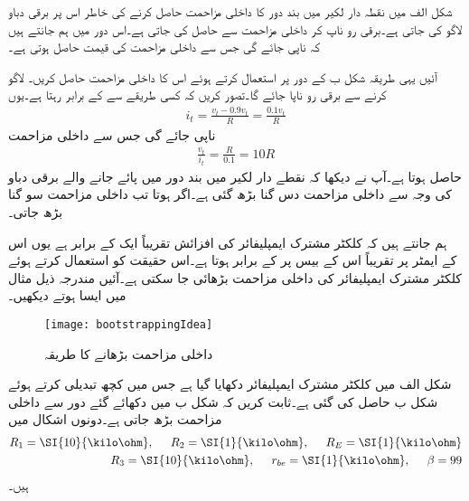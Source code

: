شکل  الف میں نقطہ دار لکیر میں بند دور کا داخلی مزاحمت حاصل کرنے کی خاطر اس پر  برقی دباو لاگو کی جاتی ہے۔برقی رو  ناپ کر داخلی مزاحمت  سے حاصل کی جاتی ہے۔اس دور میں ہم جانتے ہیں کہ  ناپی جائے گی جس سے داخلی مزاحمت کی قیمت  حاصل ہوتی ہے۔

آئیں یہی طریقہ شکل  ب کے دور پر استعمال کرتے ہوئے اس کا داخلی مزاحمت حاصل کریں۔ لاگو کرنے سے  برقی رو ناپا جائے گا۔تصور کریں کہ کسی طریقے سے  کے برابر رہتا ہے۔یوں
\begin{align*}
i_t=\frac{v_t-0.9 v_t}{R}=\frac{0.1 v_t}{R}
\end{align*}
ناپی جائے گی جس سے داخلی مزاحمت
\begin{align*}
\frac{v_t}{i_t}=\frac{R}{0.1}=10 R
\end{align*}
حاصل ہوتا ہے۔آپ نے دیکھا کہ نقطے دار لکیر میں بند دور میں پائے جانے والے برقی دباو  کی وجہ سے داخلی مزاحمت دس گنا بڑھ گئی ہے۔اگر  ہوتا تب داخلی مزاحمت سو گنا بڑھ جاتی۔

ہم جانتے ہیں کہ کلکٹر  مشترک ایمپلیفائر کی افزائش تقریباً ایک کے برابر ہے یوں اس کے  ایمٹر پر  تقریباً اس کے بیس پر  کے برابر ہوتا ہے۔اس حقیقت کو استعمال کرتے ہوئے کلکٹر  مشترک ایمپلیفائر کی داخلی مزاحمت بڑھائی جا سکتی ہے۔آئیں مندرجہ ذیل مثال میں ایسا ہوتے دیکھیں۔
%
\begin{figure}
\centering
\texttt{[image: bootstrappingIdea]}
\caption{داخلی مزاحمت بڑھانے کا طریقہ}
\label{شکل_ٹرانزسٹر_داخلی_مزاحمت_بڑھانے_کا_طریقہ}
\end{figure}


شکل  الف میں کلکٹر  مشترک ایمپلیفائر دکھایا گیا ہے جس میں کچھ تبدیلی کرتے ہوئے شکل  ب  حاصل کی گئی ہے۔ثابت کریں کہ شکل  ب میں دکھائے گئے دور سے  داخلی مزاحمت  بڑھ جاتی ہے۔دونوں اشکال میں
\begin{align*}
R_1=\SI{10}{\kilo \ohm}, \hspace{5mm} R_2=\SI{1}{\kilo \ohm}, \hspace{5mm} R_E=\SI{1}{\kilo \ohm}\\
R_3=\SI{10}{\kilo \ohm}, \hspace{5mm} r_{be}=\SI{1}{\kilo \ohm}, \hspace{5mm} \beta=99
\end{align*}
ہیں۔

